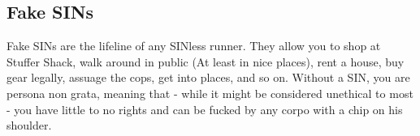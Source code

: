 
\subsection{Fake SINs}\label{fake_SINs}

Fake SINs are the lifeline of any SINless runner. They allow you to shop at Stuffer Shack, walk around in public (At least in nice places), rent a house, buy gear legally, assuage the cops, get into places, and so on. Without a SIN, you are persona non grata, meaning that - while it might be considered unethical to most - you have little to no rights and can be fucked by any corpo with a chip on his shoulder.

